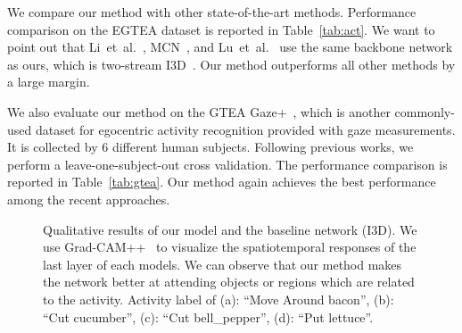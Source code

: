 \documentclass[10pt,twocolumn,letterpaper]{article}
\begin{document}
We compare our method with other state-of-the-art methods. Performance comparison on the EGTEA dataset is reported in Table~\ref{tab:act}. We want to point out that Li~et~al.~\cite{li2018eye}, MCN~\cite{huang2019mutual}, and Lu~et~al.~\cite{lu2019learning} use the same backbone network as ours, which is two-stream I3D~\cite{carreira2017quo}. Our method outperforms all other methods by a large margin.

We also evaluate our method on the GTEA Gaze+~\cite{li2015delving}, which is another commonly-used dataset for egocentric activity recognition provided with gaze measurements. It is collected by 6 different human subjects. Following previous works, we perform a leave-one-subject-out cross validation. The performance comparison is reported in Table~\ref{tab:gtea}. Our method again achieves the best performance among the recent approaches.

\begin{figure*}[t]
\centering
\hspace{-6pt}
  \hspace{0.029cm}\vline\hspace{0.02cm}
  \caption{Qualitative results of our model and the baseline network (I3D). We use Grad-CAM++~\cite{chattopadhay2018grad} to visualize the spatiotemporal responses of the last layer of each models. We can observe that our method makes the network better at attending objects or regions which are related to the activity. Activity label of (a): ``Move Around bacon'', (b): ``Cut cucumber'', (c): ``Cut bell\_pepper'', (d): ``Put lettuce''.}
  \label{fig:qual}
\end{figure*}
\end{document}
